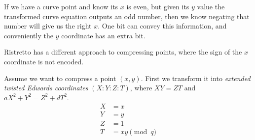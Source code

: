 If we have a curve point and know its $x$ is even, but given its $y$ value the transformed curve equation outputs an odd number, then we know negating that number will give us the right $x$. One bit can convey this information, and conveniently the $y$ coordinate has an extra bit.

Ristretto has a different approach to compressing points, where the sign of the $x$ coordinate is not encoded.

Assume we want to compress a point \((x, y)\). First we transform it into {\em extended twisted Edwards coordinates} \cite{twisted-edwards-revisited} $(X:Y:Z:T)$, where $X Y = Z T$ and $a X^2 + Y^2 = Z^2 + d T^2$.\vspace{.115cm}
\begin{align*}
    X &= x\\
    Y &= y\\
    Z &= 1 \\
    T &= xy \pmod q
\end{align*}

